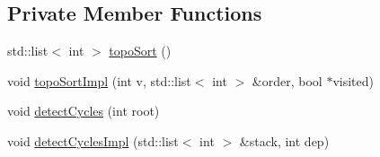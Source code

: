 \subsection*{Private Member Functions}
\begin{DoxyCompactItemize}
\item 
std\+::list$<$ int $>$ \hyperlink{structvt_1_1runtime_1_1component_1_1_component_pack_a5ca923fe22474d1c26a97d6d5dbfc0a3}{topo\+Sort} ()
\item 
void \hyperlink{structvt_1_1runtime_1_1component_1_1_component_pack_a7cb370457771ba9ebccd8892ffdafca9}{topo\+Sort\+Impl} (int v, std\+::list$<$ int $>$ \&order, bool $\ast$visited)
\item 
void \hyperlink{structvt_1_1runtime_1_1component_1_1_component_pack_a8e76881b315cccf8171f177a84d66f83}{detect\+Cycles} (int root)
\item 
void \hyperlink{structvt_1_1runtime_1_1component_1_1_component_pack_acbe1421990318c9c43d5a83add91fa31}{detect\+Cycles\+Impl} (std\+::list$<$ int $>$ \&stack, int dep)
\end{DoxyCompactItemize}
